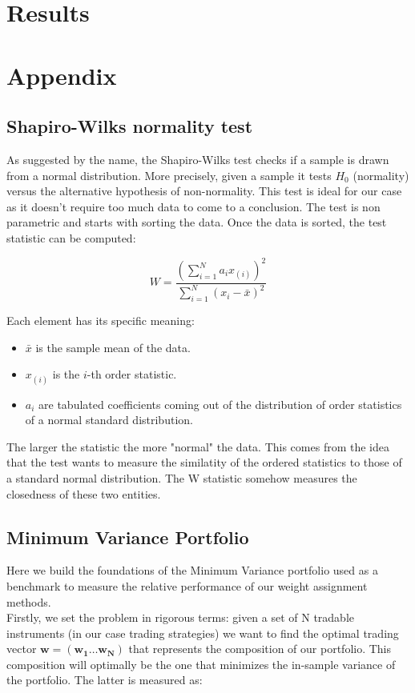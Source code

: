 \documentclass[a4paper]{article}
\begin{document}
\section*{Results}

\section*{Appendix}


\subsection*{Shapiro-Wilks normality test}

As suggested by the name, the Shapiro-Wilks test checks if a sample is drawn from a normal distribution. More precisely, given a sample it tests $H_0$ (normality) versus the alternative hypothesis of non-normality. This test is ideal for our case as it doesn't require too much data to come to a conclusion. The test is non parametric and starts with sorting the data. Once the data is sorted, the test statistic can be computed:

$$
\displaystyle W = \frac{\left(\sum\limits_{i=1}^N a_{i}x_{(i)}\right)^2}{\sum\limits_{i=1}^N(x_i-\bar{x})^2}
$$

Each element has its specific meaning:
\begin{itemize}
	\item $\bar{x}$ is the sample mean of the data.
	\item $x_{(i)}$ is the $i$-th order statistic. 
	\item $a_i$ are tabulated coefficients coming out of the distribution of order statistics of a normal standard distribution.
\end{itemize}

The larger the statistic the more "normal" the data. This comes from the idea that the test wants to measure the similatity of the ordered statistics to those of a standard normal distribution. The W statistic somehow measures the closedness of these two entities.

\subsection*{Minimum Variance Portfolio}

Here we build the foundations of the Minimum Variance portfolio used as a benchmark to measure the relative performance of our weight assignment methods.\\
Firstly, we set the problem in rigorous terms: given a set of N tradable instruments (in our case trading strategies) we want to find the optimal trading vector $\mathbf{w} = (\mathbf{w_1} \dots \mathbf{w_N})$ that represents the composition of our portfolio. This composition will optimally be the one that minimizes the in-sample variance of the portfolio. The latter is measured as:
\end{document}
